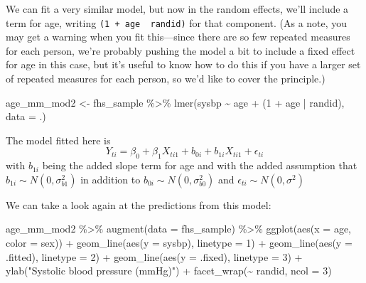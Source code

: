 \documentclass[
]{book}
\newenvironment{Shaded}{\begin{snugshade}}{\end{snugshade}}
\newcommand{\AttributeTok}[1]{\textcolor[rgb]{0.77,0.63,0.00}{#1}}
\newcommand{\DecValTok}[1]{\textcolor[rgb]{0.00,0.00,0.81}{#1}}
\newcommand{\FunctionTok}[1]{\textcolor[rgb]{0.00,0.00,0.00}{#1}}
\newcommand{\NormalTok}[1]{#1}
\newcommand{\OtherTok}[1]{\textcolor[rgb]{0.56,0.35,0.01}{#1}}
\newcommand{\SpecialCharTok}[1]{\textcolor[rgb]{0.00,0.00,0.00}{#1}}
\newcommand{\StringTok}[1]{\textcolor[rgb]{0.31,0.60,0.02}{#1}}
\begin{document}
We can fit a very similar model, but now in the random effects, we'll include
a term for age, writing \texttt{(1\ +\ age\ \textbar{}\ randid)} for that component. (As a note, you
may get a warning when you fit this---since there are so few repeated measures
for each person, we're probably pushing the model a bit to include a fixed
effect for age in this case, but it's useful to know how to do this if you
have a larger set of repeated measures for each person, so we'd like to
cover the principle.)

\begin{Shaded}
\begin{Highlighting}[]
\NormalTok{age\_mm\_mod2 }\OtherTok{\textless{}{-}}\NormalTok{ fhs\_sample }\SpecialCharTok{\%\textgreater{}\%} 
  \FunctionTok{lmer}\NormalTok{(sysbp }\SpecialCharTok{\textasciitilde{}}\NormalTok{ age }\SpecialCharTok{+}\NormalTok{ (}\DecValTok{1} \SpecialCharTok{+}\NormalTok{ age }\SpecialCharTok{|}\NormalTok{ randid), }\AttributeTok{data =}\NormalTok{ .) }
\end{Highlighting}
\end{Shaded}

The model fitted here is
\[
Y_{ti} = \beta_{0} + \beta_{1}X_{ti1} + b_{0i} + b_{1i}X_{ti1} + \epsilon_{ti}
\]
with \(b_{1i}\) being the added slope term for age and with the added assumption
that \(b_{1i} \sim N(0,\sigma_{b1}^2)\) in addition to \(b_{0i} \sim N(0,\sigma_{b0}^2)\)
and \(\epsilon_{ti} \sim N(0,\sigma^2)\)

We can take a look again at the predictions from this model:

\begin{Shaded}
\begin{Highlighting}[]
\NormalTok{age\_mm\_mod2 }\SpecialCharTok{\%\textgreater{}\%} 
  \FunctionTok{augment}\NormalTok{(}\AttributeTok{data =}\NormalTok{ fhs\_sample) }\SpecialCharTok{\%\textgreater{}\%} 
  \FunctionTok{ggplot}\NormalTok{(}\FunctionTok{aes}\NormalTok{(}\AttributeTok{x =}\NormalTok{ age, }\AttributeTok{color =}\NormalTok{ sex)) }\SpecialCharTok{+} 
  \FunctionTok{geom\_line}\NormalTok{(}\FunctionTok{aes}\NormalTok{(}\AttributeTok{y =}\NormalTok{ sysbp), }\AttributeTok{linetype =} \DecValTok{1}\NormalTok{) }\SpecialCharTok{+} 
  \FunctionTok{geom\_line}\NormalTok{(}\FunctionTok{aes}\NormalTok{(}\AttributeTok{y =}\NormalTok{ .fitted), }\AttributeTok{linetype =} \DecValTok{2}\NormalTok{) }\SpecialCharTok{+} 
  \FunctionTok{geom\_line}\NormalTok{(}\FunctionTok{aes}\NormalTok{(}\AttributeTok{y =}\NormalTok{ .fixed), }\AttributeTok{linetype =} \DecValTok{3}\NormalTok{) }\SpecialCharTok{+}
  \FunctionTok{ylab}\NormalTok{(}\StringTok{"Systolic blood pressure (mmHg)"}\NormalTok{) }\SpecialCharTok{+} 
  \FunctionTok{facet\_wrap}\NormalTok{(}\SpecialCharTok{\textasciitilde{}}\NormalTok{ randid, }\AttributeTok{ncol =} \DecValTok{3}\NormalTok{)}
\end{Highlighting}
\end{Shaded}
\end{document}
